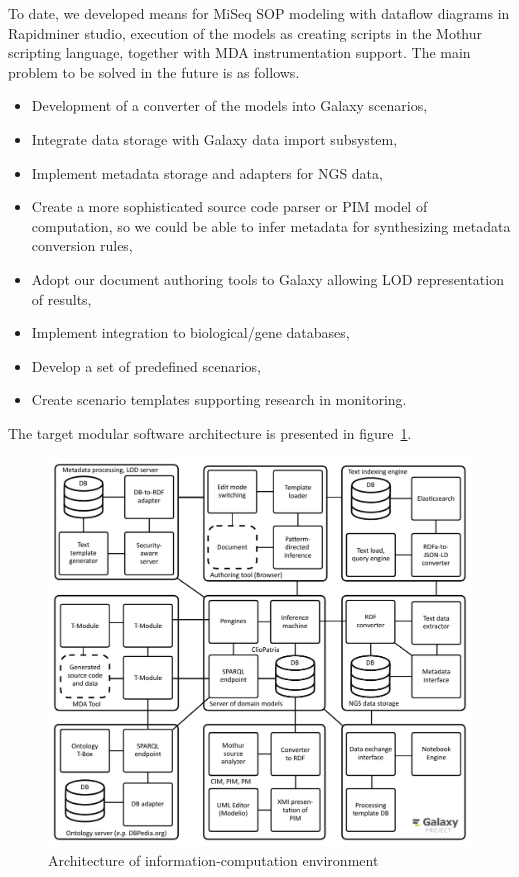 \documentclass[a4paper]{jpconf}
\begin{document}
To date, we developed means for MiSeq SOP modeling with dataflow diagrams in Rapidminer studio, execution of the models as creating scripts in the Mothur scripting language, together with MDA instrumentation support. The main problem to be solved in the future is as follows.
\begin{itemize}
\item Development of a converter of the models into Galaxy scenarios,
\item Integrate data storage with Galaxy data import subsystem,
\item Implement metadata storage and adapters for NGS data,
\item Create a more sophisticated source code parser or PIM model of computation, so we could be able to infer metadata for synthesizing metadata conversion rules,
\item Adopt our document authoring tools to Galaxy allowing LOD representation of results,
\item Implement integration to biological/gene databases,
\item Develop a set of predefined scenarios,
\item Create scenario templates supporting research in monitoring.
\end{itemize}
The target modular software architecture is presented in figure~\ref{fig:metadata}.
\begin{figure}[bt]
  \centering
   \includegraphics[width=0.8\linewidth]{architecture-mda-lod-ext-galaxy.pdf}
  \caption{Architecture of information-computation environment}
  \label{fig:metadata}
\end{figure}
\end{document}
